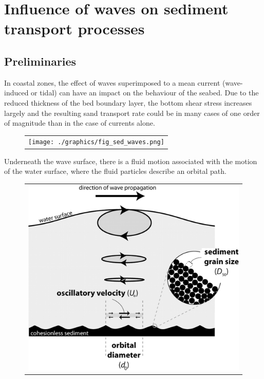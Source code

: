 \chapter[Influence of waves on sediment transport]{Influence of waves on sediment transport processes}\label{ch:sed_waves}

\section{Preliminaries}
In coastal zones, the effect of waves superimposed to a mean current (wave-induced or tidal) can have an impact on the behaviour of the seabed. Due to the reduced thickness of the bed boundary layer, the bottom shear stress increases largely and the resulting sand transport rate could be in many cases of one order of magnitude than in the case of currents alone.

\begin{figure}[H]%
  \begin{center}
\begin{tabular}{c}
\texttt{[image: ./graphics/fig\_sed\_waves.png]}
\end{tabular}
\end{center}
\end{figure}

Underneath the wave surface, there is a fluid motion associated with the motion of the water surface, where the fluid particles describe an orbital path.

\begin{figure}[H]%
  \begin{center}
\begin{tabular}{c}
\includegraphics[scale=0.12]{./graphics/orbital_large.jpg}
\end{tabular}
\end{center}
\end{figure}


